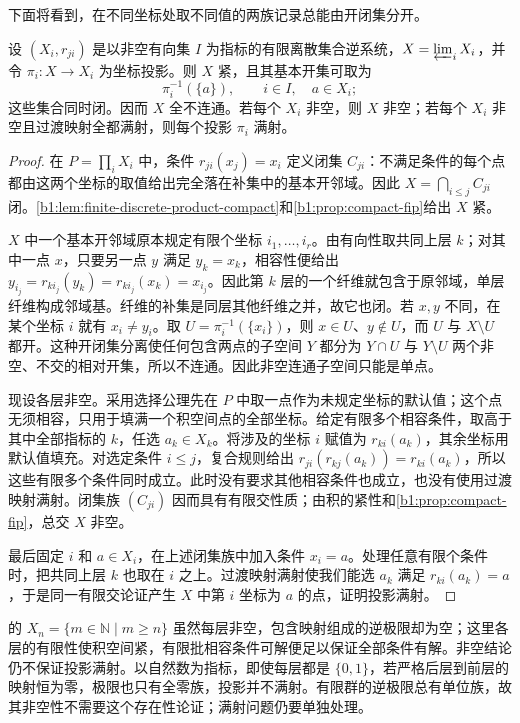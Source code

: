 下面将看到，在不同坐标处取不同值的两族记录总能由开闭集分开。

\begin{proposition}\label{b1:prop:finite-inverse-limit}
	设 \((X_i,r_{ji})\) 是以非空有向集 \(I\) 为指标的有限离散集合逆系统，\(X=\varprojlim_iX_i\)，并令 \(\pi_i:X\rightarrow X_i\) 为坐标投影。则 \(X\) 紧，且其基本开集可取为
	\[
		\pi_i^{-1}(\{a\}),\qquad i\in I,\quad a\in X_i;
	\]
	这些集合同时闭。因而 \(X\) 全不连通。若每个 \(X_i\) 非空，则 \(X\) 非空；若每个 \(X_i\) 非空且过渡映射全都满射，则每个投影 \(\pi_i\) 满射。
\end{proposition}

\begin{proof}
	在 \(P=\prod_iX_i\) 中，条件 \(r_{ji}(x_j)=x_i\) 定义闭集 \(C_{ji}\)：不满足条件的每个点都由这两个坐标的取值给出完全落在补集中的基本开邻域。因此 \(X=\bigcap_{i\leq j}C_{ji}\) 闭。\cref{b1:lem:finite-discrete-product-compact}和\cref{b1:prop:compact-fip}给出 \(X\) 紧。

	\(X\) 中一个基本开邻域原本规定有限个坐标 \(i_1,\ldots,i_r\)。由有向性取共同上层 \(k\)；对其中一点 \(x\)，只要另一点 \(y\) 满足 \(y_k=x_k\)，相容性便给出 \(y_{i_j}=r_{ki_j}(y_k)=r_{ki_j}(x_k)=x_{i_j}\)。因此第 \(k\) 层的一个纤维就包含于原邻域，单层纤维构成邻域基。纤维的补集是同层其他纤维之并，故它也闭。若 \(x,y\) 不同，在某个坐标 \(i\) 就有 \(x_i\ne y_i\)。取 \(U=\pi_i^{-1}(\{x_i\})\)，则 \(x\in U\)、\(y\notin U\)，而 \(U\) 与 \(X\setminus U\) 都开。这种开闭集分离使任何包含两点的子空间 \(Y\) 都分为 \(Y\cap U\) 与 \(Y\setminus U\) 两个非空、不交的相对开集，所以不连通。因此非空连通子空间只能是单点。

	现设各层非空。采用选择公理先在 \(P\) 中取一点作为未规定坐标的默认值；这个点无须相容，只用于填满一个积空间点的全部坐标。给定有限多个相容条件，取高于其中全部指标的 \(k\)，任选 \(a_k\in X_k\)。将涉及的坐标 \(i\) 赋值为 \(r_{ki}(a_k)\)，其余坐标用默认值填充。对选定条件 \(i\leq j\)，复合规则给出 \(r_{ji}(r_{kj}(a_k))=r_{ki}(a_k)\)，所以这些有限多个条件同时成立。此时没有要求其他相容条件也成立，也没有使用过渡映射满射。闭集族 \((C_{ji})\) 因而具有有限交性质；由积的紧性和\cref{b1:prop:compact-fip}，总交 \(X\) 非空。

	最后固定 \(i\) 和 \(a\in X_i\)，在上述闭集族中加入条件 \(x_i=a\)。处理任意有限个条件时，把共同上层 \(k\) 也取在 \(i\) 之上。过渡映射满射使我们能选 \(a_k\) 满足 \(r_{ki}(a_k)=a\)，于是同一有限交论证产生 \(X\) 中第 \(i\) 坐标为 \(a\) 的点，证明投影满射。
\end{proof}

的 \(X_n=\{m\in\mathbb N\mid m\geq n\}\) 虽然每层非空，包含映射组成的逆极限却为空；这里各层的有限性使积空间紧，有限批相容条件可解便足以保证全部条件有解。非空结论仍不保证投影满射。以自然数为指标，即使每层都是 \(\{0,1\}\)，若严格后层到前层的映射恒为零，极限也只有全零族，投影并不满射。有限群的逆极限总有单位族，故其非空性不需要这个存在性论证；满射问题仍要单独处理。

